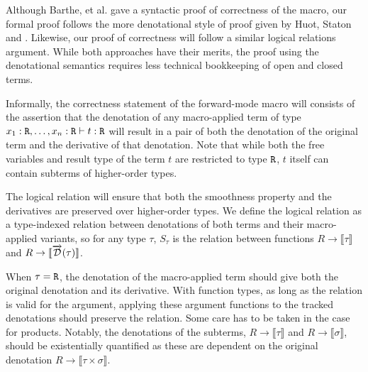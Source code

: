   Although Barthe, et al.\cite{barthe2020versatility} gave a syntactic proof of correctness of the macro, our formal proof follows the more denotational style of proof given by Huot, Staton and \Vakar{}\cite{huot2020correctness}.
  Likewise, our proof of correctness will follow a similar logical relations argument.
  While both approaches have their merits, the proof using the denotational semantics requires less technical bookkeeping of open and closed terms.

  Informally, the correctness statement of the forward-mode macro will consists of the assertion that the denotation of any macro-applied term of type $x_1 : \texttt{R}, \dots, x_n : \texttt{R} \vdash t : \texttt{R}$ will result in a pair of both the denotation of the original term and the derivative of that denotation.
  Note that while both the free variables and result type of the term $t$ are restricted to type $\texttt{R}$, $t$ itself can contain subterms of higher-order types.

  The logical relation will ensure that both the smoothness property and the derivatives are preserved over higher-order types.
  We define the logical relation as a type-indexed relation between denotations of both terms and their macro-applied variants, so for any type $\tau$, $S_\tau$ is the relation between functions $R \rightarrow \llbracket \tau \rrbracket$ and $R \rightarrow \llbracket \overrightarrow{\mathcal{D}}(\tau) \rrbracket$.

  When $\tau = \texttt{R}$, the denotation of the macro-applied term should give both the original denotation and its derivative.
  With function types, as long as the relation is valid for the argument, applying these argument functions to the tracked denotations should preserve the relation.
  Some care has to be taken in the case for products.
  Notably, the denotations of the subterms, $R \rightarrow \llbracket \tau \rrbracket$ and $R \rightarrow \llbracket \sigma \rrbracket$, should be existentially quantified as these are dependent on the original denotation $R \rightarrow \llbracket \tau \times \sigma \rrbracket$.

